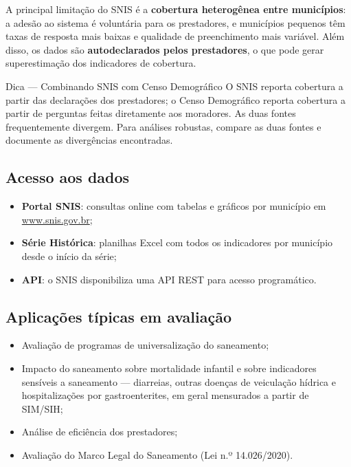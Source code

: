 A principal limitação do SNIS é a \textbf{cobertura heterogênea entre municípios}: a adesão ao sistema é voluntária para os prestadores, e municípios pequenos têm taxas de resposta mais baixas e qualidade de preenchimento mais variável. Além disso, os dados são \textbf{autodeclarados pelos prestadores}, o que pode gerar superestimação dos indicadores de cobertura.

\begin{boxdica}{Dica --- Combinando SNIS com Censo Demográfico}
O SNIS reporta cobertura a partir das declarações dos prestadores; o Censo Demográfico reporta cobertura a partir de perguntas feitas diretamente aos moradores. As duas fontes frequentemente divergem. Para análises robustas, compare as duas fontes e documente as divergências encontradas.
\end{boxdica}

\subsection{Acesso aos dados}

\begin{itemize}
  \item \textbf{Portal SNIS}: consultas online com tabelas e gráficos por município em \url{www.snis.gov.br};
  \item \textbf{Série Histórica}: planilhas Excel com todos os indicadores por município desde o início da série;
  \item \textbf{API}: o SNIS disponibiliza uma API REST para acesso programático.
\end{itemize}

\subsection{Aplicações típicas em avaliação}

\begin{itemize}
  \item Avaliação de programas de universalização do saneamento;
  \item Impacto do saneamento sobre mortalidade infantil e sobre indicadores sensíveis a saneamento --- diarreias, outras doenças de veiculação hídrica e hospitalizações por gastroenterites, em geral mensurados a partir de SIM/SIH;
  \item Análise de eficiência dos prestadores;
  \item Avaliação do Marco Legal do Saneamento (Lei n.º 14.026/2020).
\end{itemize}

